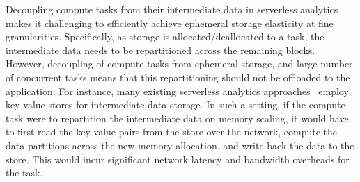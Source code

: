 Decoupling compute tasks from their intermediate data in serverless analytics makes it challenging to efficiently achieve ephemeral storage elasticity at fine granularities. Specifically, as storage is allocated/deallocated to a task, the intermediate data needs to be repartitioned across the remaining blocks. However, decoupling of compute tasks from ephemeral storage, and large number of concurrent tasks means that this repartitioning should not be offloaded to the application. For instance, many existing serverless analytics approaches~\cite{locus, pocket} employ key-value stores for intermediate data storage. In such a setting, if the compute task were to repartition the intermediate data on memory scaling, it would have to first read the key-value pairs from the store over the network, compute the data partitions across the new memory allocation, and write back the data to the store. This would incur significant network latency and bandwidth overheads for the task.  

